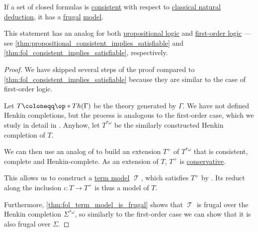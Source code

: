\begin{corollary}\label{thm:hol_consistent_implies_satisfiable}
  If a set of closed formulas is \hyperref[def:hol_theory/consistent]{consistent} with respect to \hyperref[def:hol_natural_deduction_system]{classical natural deduction}, it has a \hyperref[def:hol_frugal_structure]{frugal} \hyperref[def:fol_semantics/model]{model}.
\end{corollary}
\begin{comments}
  \item This statement has an analog for both \hyperref[def:propositional_logic]{propositional logic} and \hyperref[def:first_order_logic]{first-order logic} --- see \cref{thm:propositional_consistent_implies_satisfiable} and \cref{thm:fol_consistent_implies_satisfiable}, respectively.
\end{comments}
\begin{proof}
  We have skipped several steps of the proof compared to \cref{thm:fol_consistent_implies_satisfiable} because they are similar to the case of first-order logic.

  Let \( T \coloneqq \op*{Th}(\Gamma) \) be the theory generated by \( \Gamma \). We have not defined Henkin completions, but the process is analogous to the first-order case, which we study in detail in . Anyhow, let \( T^{*\omega} \) be the similarly constructed Henkin completion of \( T \).

  We can then use an analog of  to build an extension \( T^+ \) of \( T^{*\omega} \) that is consistent, complete and Henkin-complete. As an extension of \( T \), \( T^+ \) is \hyperref[def:hol_theory/conservative]{conservative}.

  This allows us to construct a \hyperref[def:hol_term_model]{term model} \( \mscrT \), which satisfies \( T^+ \) by . Its reduct along the inclusion \( \iota: T \to T^+ \) is thus a model of \( T \).

  Furthermore, \cref{thm:fol_term_model_is_frugal} shows that \( \mscrT \) is frugal over the Henkin completion \( \Sigma^{*\omega} \), so similarly to the first-order case we can show that it is also frugal over \( \Sigma \).
\end{proof}

